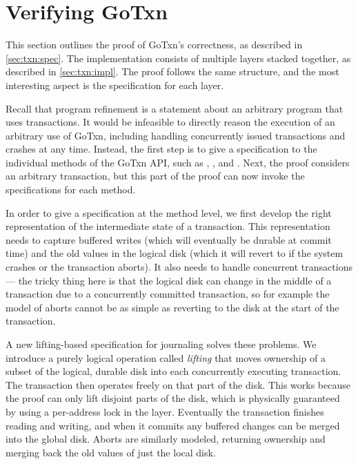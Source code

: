 \section{Verifying GoTxn}
\label{sec:txn:proof}

This section outlines the proof of GoTxn's correctness, as described in
\cref{sec:txn:spec}. The implementation consists of multiple layers stacked
together, as described in \cref{sec:txn:impl}. The proof follows the same
structure, and the most interesting aspect is the specification for each layer.

Recall that program refinement is a statement about an arbitrary program that
uses transactions. It would be infeasible to directly reason the execution of an
arbitrary use of GoTxn, including handling concurrently issued transactions and
crashes at any time. Instead, the first step is to give a specification to the
individual methods of the GoTxn API, such as , , and
. Next, the proof considers an arbitrary transaction, but this part
of the proof can now invoke the specifications for each method.

In order to give a specification at the method level, we first
develop the right representation of the intermediate state of a transaction.
This representation needs to capture buffered writes (which will eventually be
durable at commit time) and the old values in the logical disk (which it will
revert to if the system crashes or the transaction aborts). It also needs to
handle concurrent transactions --- the tricky thing here is that the logical
disk can change in the middle of a transaction due to a concurrently committed
transaction, so for example the model of aborts cannot be as simple as reverting
to the disk at the start of the transaction.

A new lifting-based specification for journaling solves these problems. We
introduce a purely logical operation called \emph{lifting} that moves ownership
of a subset of the logical, durable disk into each concurrently executing
transaction. The transaction then operates freely on that part of the disk. This
works because the proof can only lift disjoint parts of the disk, which is
physically guaranteed by using a per-address lock in the  layer.
Eventually the transaction finishes reading and writing, and when it commits any
buffered changes can be merged into the global disk. Aborts are similarly
modeled, returning ownership and merging back the old values of just the local
disk.

